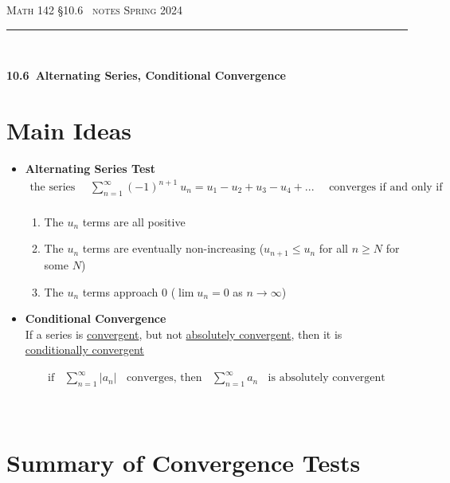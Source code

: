 \documentclass{article}
\def\chapt{10.6}
\def\chaptname{Alternating Series, Conditional Convergence}
\begin{document}
\noindent
{\scshape Math 142} \hfill {\scshape \S\chapt~ notes} \hfill {\scshape Spring 2024}

\smallskip

\hrule

\bigskip

\hfill
\\

\thispagestyle{empty}

{
\huge
\noindent
\textbf{\chapt~\chaptname}
}

\section*{Main Ideas}

\begin{itemize}

\item
\textbf{Alternating Series Test}
\begin{gather*}
\text{the series}~~~~~~
\sum_{n=1}^{\infty} (-1)^{n+1} ~u_n = u_1 - u_2 + u_3 - u_4 + ...
~~~~~~\text{converges if and only if}
\\
\end{gather*}

\begin{enumerate}
\item
The $u_n$ terms are all positive

\item
The $u_n$ terms are eventually non-increasing ($u_{n+1} \leq u_n$ for all $n \geq N$ for some $N$)

\item
The $u_n$ terms approach 0 ($\lim u_n=0$ as $n\to \infty$)
\end{enumerate}

\item
\textbf{Conditional Convergence}
\\

If a series is \underline{convergent}, but not \underline{absolutely convergent},
then it is \underline{conditionally convergent}

\begin{gather*}
\text{if}~~~~
\sum_{n=1}^{\infty} |a_n|
~~~~\text{converges, then}~~~~
\sum_{n=1}^{\infty} a_n
~~~~\text{is absolutely convergent}
\end{gather*}

\end{itemize}
\hfill
\\

\section*{Summary of Convergence Tests}
\end{document}
